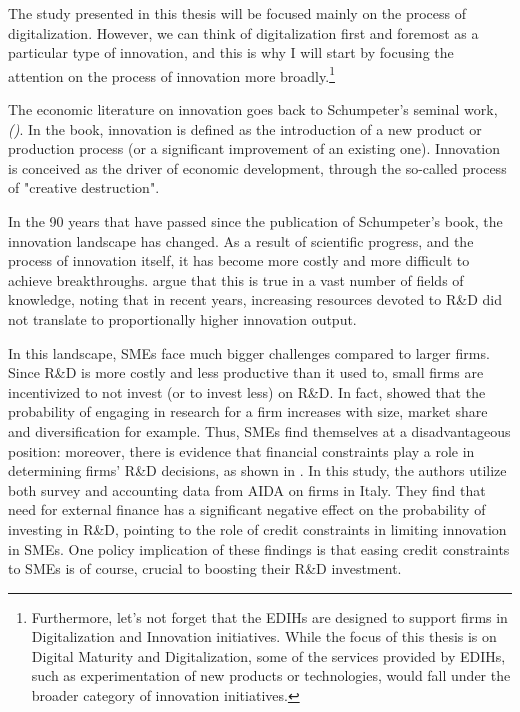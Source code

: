 \documentclass[12pt]{report}
\begin{document}
\par The study presented in this thesis will be focused mainly on the process of digitalization. However, we can think of digitalization first and foremost as a particular type of innovation, and this is why I will start by focusing the attention on the process of innovation more broadly.\footnote{Furthermore, let's not forget that the EDIHs are designed to support firms in Digitalization and Innovation initiatives. While the focus of this thesis is on Digital Maturity and Digitalization, some of the services provided by EDIHs, such as experimentation of new products or technologies, would fall under the broader category of innovation initiatives.} 
\par The economic literature on innovation goes back to Schumpeter's seminal work, \textit{ (\citeyear{Schumpeter1934})}. In the book, innovation is defined as the introduction of a new product or production process (or a significant improvement of an existing one). Innovation is conceived as the driver of economic development, through the so-called process of "creative destruction". 
\par In the 90 years that have passed since the publication of Schumpeter's book, the innovation landscape has changed. As a result of scientific progress, and the process of innovation itself, it has become more costly and more difficult to achieve breakthroughs. \cite{bloom2020} argue that this is true in a vast number of fields of knowledge, noting that in recent years, increasing resources devoted to R\&D did not translate to proportionally higher innovation output.
\par In this landscape, SMEs face much bigger challenges compared to larger firms. Since R\&D is more costly and less productive than it used to, small firms are incentivized to not invest (or to invest less) on R\&D. In fact, \cite{Crepon1998} showed that the probability of engaging in research for a firm increases with size, market share and diversification for example. Thus, SMEs find themselves at a disadvantageous position: moreover, there is evidence that financial constraints play a role in determining firms' R\&D decisions, as shown in \cite{Mancusi2014}. In this study, the authors utilize both survey and accounting data from AIDA on firms in Italy. They find that need for external finance has a significant negative effect on the probability of investing in R\&D, pointing to the role of credit constraints in limiting innovation in SMEs. One policy implication of these findings is that easing credit constraints to SMEs is of course, crucial to boosting their R\&D investment.
\end{document}
